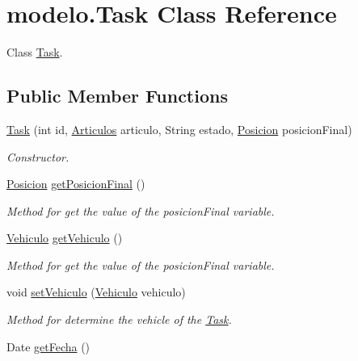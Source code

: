 \hypertarget{classmodelo_1_1_task}{}\section{modelo.\+Task Class Reference}
\label{classmodelo_1_1_task}


Class \mbox{\hyperlink{classmodelo_1_1_task}{Task}}.  


\subsection*{Public Member Functions}
\begin{DoxyCompactItemize}
\item 
\mbox{\hyperlink{classmodelo_1_1_task_a0c361bddb0b03c29075d7c7cd09ff625}{Task}} (int id, \mbox{\hyperlink{classmodelo_1_1_articulos}{Articulos}} articulo, String estado, \mbox{\hyperlink{classmodelo_1_1_posicion}{Posicion}} posicion\+Final)
\begin{DoxyCompactList}\small\item\em Constructor. \end{DoxyCompactList}\item 
\mbox{\hyperlink{classmodelo_1_1_posicion}{Posicion}} \mbox{\hyperlink{classmodelo_1_1_task_a98fe3bd9261ee8b560195c5256fbf4ec}{get\+Posicion\+Final}} ()
\begin{DoxyCompactList}\small\item\em Method for get the value of the posicion\+Final variable. \end{DoxyCompactList}\item 
\mbox{\hyperlink{classmodelo_1_1_vehiculo}{Vehiculo}} \mbox{\hyperlink{classmodelo_1_1_task_af3ec78e6405c7d5b912798d959b5a780}{get\+Vehiculo}} ()
\begin{DoxyCompactList}\small\item\em Method for get the value of the posicion\+Final variable. \end{DoxyCompactList}\item 
void \mbox{\hyperlink{classmodelo_1_1_task_a9303b782e49cabf729418196a2712ba0}{set\+Vehiculo}} (\mbox{\hyperlink{classmodelo_1_1_vehiculo}{Vehiculo}} vehiculo)
\begin{DoxyCompactList}\small\item\em Method for determine the vehicle of the \mbox{\hyperlink{classmodelo_1_1_task}{Task}}. \end{DoxyCompactList}\item 
Date \mbox{\hyperlink{classmodelo_1_1_task_ac1c34ccbefefc2485356474f6655fc3f}{get\+Fecha}} ()

\end{DoxyCompactItemize}
